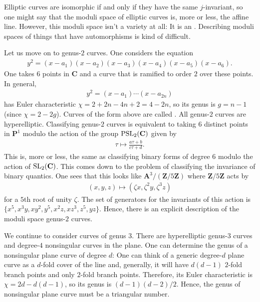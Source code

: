 \documentclass [11 pt, oneside] {article}
\begin{document}
Elliptic curves are isomorphic if and only if they have the same $j$-invariant, so one might say that the moduli space of elliptic curves is, more or less, the affine line. However, this moduli space isn't a variety at all: It is an . Describing moduli spaces of things that have automorphisms is kind of difficult.

Let us move on to genus-$2$ curves. One considers the equation
\begin{align*}
	y^2 = (x-a_1)(x-a_2)(x-a_3)(x-a_4) (x-a_5) (x-a_6).
\end{align*}
One takes $6$ points in $\mathbf{C}$ and a curve that is ramified to order $2$ over these points. In general,
\begin{align*}
	y^2 = (x-a_1)\cdots (x-a_{2n})
\end{align*}
has Euler characteristic $\chi = 2+2n-4n +2 = 4-2n$, so its genus is $g=n-1$ (since $\chi = 2-2g$). Curves of the form above are called . All genus-$2$ curves are hyperelliptic. Classifying genus-$2$ curves is equivalent to taking $6$ distinct points in $\mathbf{P}^1$ modulo the action of the group $\operatorname{PSL}_{2}(\mathbf{C})$ given by
\begin{align*}
	\tau \longmapsto \frac{a\tau+b}{c\tau+d}.
\end{align*}
This is, more or less, the same as classifying binary forms of degree $6$ modulo the action of $\operatorname{SL}_{2}(\mathbf{C})$. This comes down to the problem of classifying the invariance of binary quantics. One sees that this looks like $\mathbf{A}^3/(\mathbf{Z}/5\mathbf{Z})$ where $\mathbf{Z}/5\mathbf{Z}$ acts by
\begin{align*}
	(x,y,z) \longmapsto  (\zeta x,\zeta^2 y, \zeta^3 z)
\end{align*}
for a $5$th root of unity $\zeta$. The set of generators for the invariants of this action is $\{x^5,x^3y,xy^2,y^5,x^2z, xz^3, z^5, yz\}$. Hence, there is an explicit description of the moduli space genus-$2$ curves. 

We continue to consider curves of genus $3$. There are hyperelliptic genus-$3$ curves and degree-$4$ nonsingular curves in the plane. One can determine the genus of a nonsingular plane curve of degree $d$: One can think of a generic degree-$d$ plane curve as a $d$-fold cover of the line and, generally, it will have $d(d-1)$ $2$-fold branch points and only $2$-fold branch points. Therefore, its Euler characteristic is $\chi = 2d -  d(d-1)$, so its genus is $(d-1) (d-2)/2$. Hence, the genus of nonsingular plane curve must be a triangular number.
\end{document}
